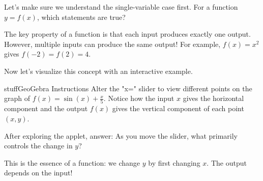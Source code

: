 \documentclass{ximera}
\begin{document}
\begin{problem}
Let's make sure we understand the single-variable case first. For a function $y = f(x)$, which statements are true?

\begin{selectAll}
\end{selectAll}

\begin{feedback}
The key property of a function is that each input produces exactly one output. However, multiple inputs can produce the same output! For example, $f(x) = x^2$ gives $f(-2) = f(2) = 4$.
\end{feedback}
\end{problem}

\begin{problem}
Now let's visualize this concept with an interactive example.

\begin{expandable}{stuff}{GeoGebra Instructions}
    Alter the "x=" slider to view different points on the graph of $f(x) = \sin(x) + \frac{x}{5}$. Notice how the input $x$ gives the horizontal component and the output $f(x)$ gives the vertical component of each point $(x,y)$.
\end{expandable}

\begin{center}
\end{center}

After exploring the applet, answer: As you move the slider, what primarily controls the change in $y$?

\begin{multipleChoice}
\end{multipleChoice}

\begin{feedback}
This is the essence of a function: we change $y$ by first changing $x$. The output depends on the input!
\end{feedback}
\end{problem}
\end{document}
